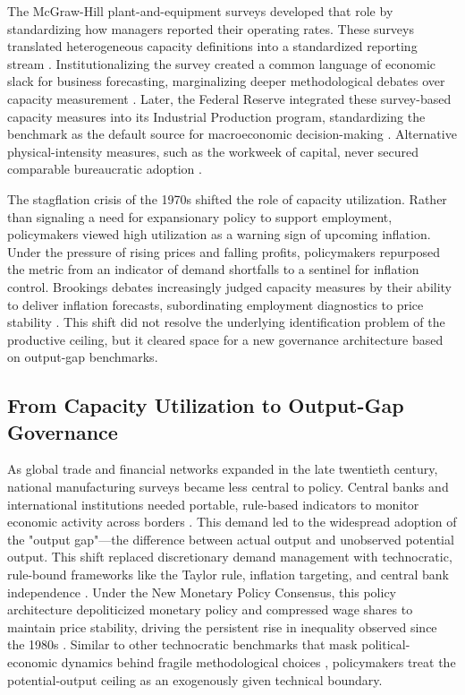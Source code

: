 \documentclass[11pt]{article}
\begin{document}
The McGraw-Hill plant-and-equipment surveys developed that role by standardizing how managers reported their operating rates. These surveys translated heterogeneous capacity definitions into a standardized reporting stream \citep{Butler1958, Phillips1963}. Institutionalizing the survey created a common language of economic slack for business forecasting, marginalizing deeper methodological debates over capacity measurement \citep{BaranSweezy1988, Munroe2007}. Later, the Federal Reserve integrated these survey-based capacity measures into its Industrial Production program, standardizing the benchmark as the default source for macroeconomic decision-making \citep{Board2017}. Alternative physical-intensity measures, such as the workweek of capital, never secured comparable bureaucratic adoption \citep{Foss1963, TaubmanGottschalk1971}.

The stagflation crisis of the 1970s shifted the role of capacity utilization. Rather than signaling a need for expansionary policy to support employment, policymakers viewed high utilization as a warning sign of upcoming inflation. Under the pressure of rising prices and falling profits, policymakers repurposed the metric from an indicator of demand shortfalls to a sentinel for inflation control. Brookings debates increasingly judged capacity measures by their ability to deliver inflation forecasts, subordinating employment diagnostics to price stability \citep{KleinEtAl1973}. This shift did not resolve the underlying identification problem of the productive ceiling, but it cleared space for a new governance architecture based on output-gap benchmarks.

\subsection{From Capacity Utilization to Output-Gap Governance}
\label{subsec:output_gap_governance}

As global trade and financial networks expanded in the late twentieth century, national manufacturing surveys became less central to policy. Central banks and international institutions needed portable, rule-based indicators to monitor economic activity across borders \citep{Jessop2002, Jessop2003, Konings2007}. This demand led to the widespread adoption of the "output gap"---the difference between actual output and unobserved potential output. This shift replaced discretionary demand management with technocratic, rule-bound frameworks like the Taylor rule, inflation targeting, and central bank independence \citep{Taylor1993, Johnson2024}. Under the New Monetary Policy Consensus, this policy architecture depoliticized monetary policy and compressed wage shares to maintain price stability, driving the persistent rise in inequality observed since the 1980s \citep{SaadFilho2018, Foster2024}. Similar to other technocratic benchmarks that mask political-economic dynamics behind fragile methodological choices \citep{HerdonAshPollinP2014, AshBasuDube2017}, policymakers treat the potential-output ceiling as an exogenously given technical boundary.
\end{document}
